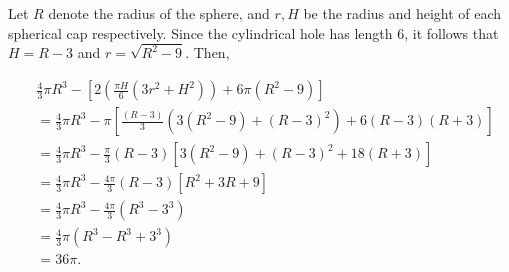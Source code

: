 \documentclass[a4paper]{article}
\begin{document}
Let $R$ denote the radius of the sphere, and $r, H$ be the radius and height of each spherical cap respectively.
Since the cylindrical hole has length $6$, it follows that $H = R - 3$ and $r=\sqrt{R^2 - 9}$. Then,

\begin{align}
& \frac{4}{3}\pi R^3 - \left[2 \left(\frac{\pi H}{6}(3r^2 + H^2) \right) + 6\pi (R^2 - 9)  \right] \\
&=\frac{4}{3}\pi R^3 -\pi\left[ \frac{(R-3)}{3} (3(R^2-9) + {(R - 3)}^2) + 6(R-3)(R+3) \right] \\
&=\frac{4}{3}\pi R^3 -\frac{\pi}{3}(R-3)\left[ 3(R^2 - 9) + {(R-3)}^2 + 18(R+3) \right] \\
&=\frac{4}{3}\pi R^3 -\frac{4\pi}{3}(R-3)\left[ R^2 + 3R + 9 \right] \\
&=\frac{4}{3}\pi R^3 -\frac{4\pi}{3}(R^3-3^3) \\
&=\frac{4}{3}\pi \left( R^3 - R^3+3^3 \right) \\
&= 36\pi.
\end{align}
\end{document}
